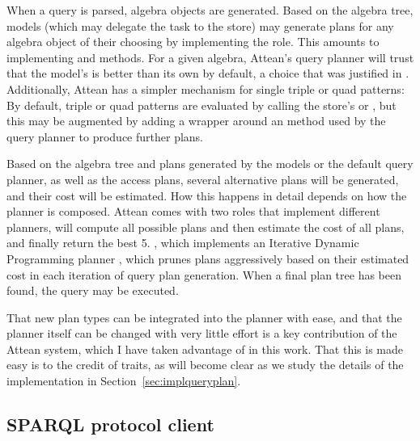 \documentclass[a4paper, 12pt]{article}
\begin{document}
When a query is parsed, algebra objects are generated. Based on the
algebra tree, models (which may delegate the task to the store) may
generate plans for any algebra object of their choosing by
implementing the  role. This amounts
to implementing  and
 methods. For a given algebra, Attean's query
planner will trust that the model's  is
better than its own by default, a choice that was justified in
\cite{williamspushing}. Additionally, Attean has a simpler mechanism
for single triple or quad patterns: By default, triple or quad
patterns are evaluated by calling the store's  or
, but this may be augmented by adding a wrapper
around an  method used by the query planner to
produce further plans.

Based on the algebra tree and plans generated by the models or the
default query planner, as well as the access plans, several
alternative plans will be generated, and their cost will be
estimated. How this happens in detail depends on how the planner is
composed. Attean comes with two roles that implement different
planners,  will compute all
possible plans and then estimate the cost of all plans, and finally
return the best 5. , which
implements an Iterative Dynamic Programming planner
\cite{Kossmann:2000:IDP:352958.352982}, which prunes plans
aggressively based on their estimated cost in each iteration of query
plan generation. When a final plan tree has been found, the query may
be executed. 

That new plan types can be integrated into the planner with ease, and
that the planner itself can be changed with very little effort is a
key contribution of the Attean system, which I have taken advantage of
in this work. That this is made easy is to the credit of traits, as
will become clear as we study the details of the implementation in
Section~\ref{sec:implqueryplan}.


\subsection{SPARQL protocol client}\label{sec:sparqlclient}
\end{document}
